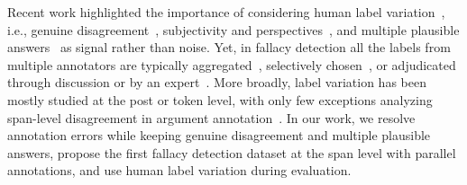 Recent work highlighted the importance of considering human label variation~\citep{plank-2022-problem}, i.e., genuine disagreement~\citep{poesio-artstein-2005-reliability}, subjectivity and perspectives~\citep{aroyo-and-welty-2015-truth,cabitza-etal-2023-toward}, and multiple plausible answers~\citep{nie-etal-2020-learn} as signal rather than noise. Yet, in fallacy detection all the labels from multiple annotators are typically aggregated~\citep{sahai-etal-2021-breaking}, selectively chosen~\citep{musi2022developing,habernal-etal-2017-argotario}, or adjudicated through discussion or by an expert~\citep[][\emph{inter alia}]{jin-etal-2022-logical,macagno2022argumentation,goffredo2022fallacious,goffredo-etal-2023-argument}. 
More broadly, label variation has been mostly studied at the post or token level, with only few exceptions analyzing span-level disagreement in argument annotation~\cite{lindahl-2024-disagreement,hautli-janisz-etal-2022-disagreement}. 
In our work, we resolve annotation errors while keeping genuine disagreement and multiple plausible answers, propose the first fallacy detection dataset at the span level with parallel annotations, and use human label variation during evaluation.

